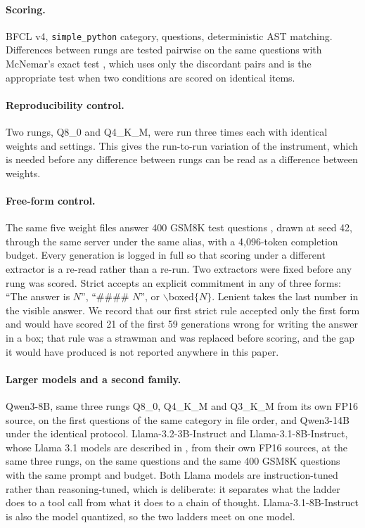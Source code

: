 \documentclass[10pt]{article}
\newcommand{\bfcl}{BFCL}
\begin{document}
\paragraph{Scoring.} \bfcl{} v4, \texttt{simple\_python} category, \qtN{} questions, deterministic AST matching. Differences between rungs are tested pairwise on the same \qtN{} questions with McNemar's exact test \citep{mcnemar1947}, which uses only the discordant pairs and is the appropriate test when two conditions are scored on identical items.

\paragraph{Reproducibility control.} Two rungs, Q8\_0 and Q4\_K\_M, were run three times each with identical weights and settings. This gives the run-to-run variation of the instrument, which is needed before any difference between rungs can be read as a difference between weights.

\paragraph{Free-form control.} The same five weight files answer 400 GSM8K test questions \citep{gsm8k2021}, drawn at seed 42, through the same server under the same alias, with a 4{,}096-token completion budget. Every generation is logged in full so that scoring under a different extractor is a re-read rather than a re-run. Two extractors were fixed before any rung was scored. Strict accepts an explicit commitment in any of three forms: ``The answer is $N$'', ``\#\#\#\# $N$'', or $\backslash$boxed$\{N\}$. Lenient takes the last number in the visible answer. We record that our first strict rule accepted only the first form and would have scored 21 of the first 59 generations wrong for writing the answer in a box; that rule was a strawman and was replaced before scoring, and the gap it would have produced is not reported anywhere in this paper.

\paragraph{Larger models and a second family.} Qwen3-8B, same three rungs Q8\_0, Q4\_K\_M and Q3\_K\_M from its own FP16 source, on the first \qtNEightB{} questions of the same category in file order, and Qwen3-14B under the identical protocol. Llama-3.2-3B-Instruct and Llama-3.1-8B-Instruct, whose Llama 3.1 models are described in \citet{llama3}, from their own FP16 sources, at the same three rungs, on the same \qtNEightB{} questions and the same 400 GSM8K questions with the same prompt and budget. Both Llama models are instruction-tuned rather than reasoning-tuned, which is deliberate: it separates what the ladder does to a tool call from what it does to a chain of thought. Llama-3.1-8B-Instruct is also the model \citet{kurt2026quant} quantized, so the two ladders meet on one model.
\end{document}
